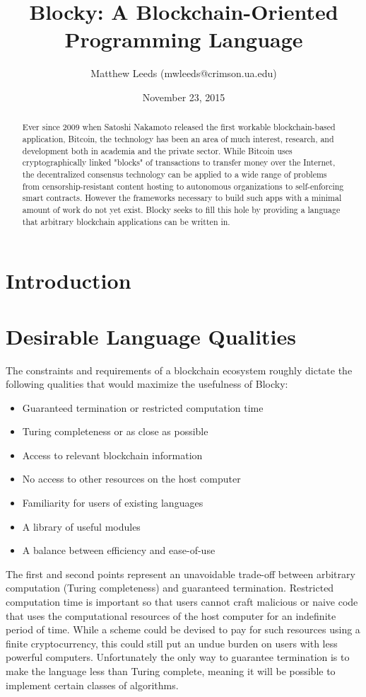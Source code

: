 \documentclass[letterpaper]{article}
\title{Blocky: A Blockchain-Oriented Programming Language}
\author{Matthew Leeds (mwleeds@crimson.ua.edu)}
\date{November 23, 2015}
\begin{document}
\maketitle

\begin{abstract}
Ever since 2009 when Satoshi Nakamoto released the first workable blockchain-based application, Bitcoin, the technology has been an area of much interest, research, and development both in academia and the private sector. While Bitcoin uses cryptographically linked "blocks" of transactions to transfer money over the Internet, the decentralized consensus technology can be applied to a wide range of problems from censorship-resistant content hosting to autonomous organizations to self-enforcing smart contracts. However the frameworks necessary to build such apps with a minimal amount of work do not yet exist. Blocky seeks to fill this hole by providing a language that arbitrary blockchain applications can be written in.
\end{abstract}

\section{Introduction}

\section{Desirable Language Qualities}

The constraints and requirements of a blockchain ecosystem roughly dictate the following qualities that would maximize the usefulness of Blocky:
\begin{itemize}
\item{Guaranteed termination or restricted computation time}
\item{Turing completeness or as close as possible}
\item{Access to relevant blockchain information}
\item{No access to other resources on the host computer}
\item{Familiarity for users of existing languages}
\item{A library of useful modules}
\item{A balance between efficiency and ease-of-use}
\end{itemize}

The first and second points represent an unavoidable trade-off between arbitrary computation (Turing completeness) and guaranteed termination. Restricted computation time is important so that users cannot craft malicious or naive code that uses the computational resources of the host computer for an indefinite period of time. While a scheme could be devised to pay for such resources using a finite cryptocurrency, this could still put an undue burden on users with less powerful computers. Unfortunately the only way to guarantee termination is to make the language less than Turing complete, meaning it will be possible to implement certain classes of algorithms.
\end{document}
